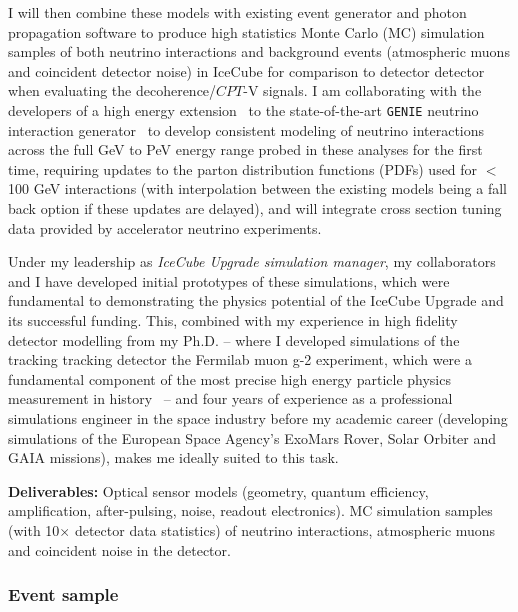 \documentclass[a4paper,11pt]{article}
\begin{document}
I will then combine these models with existing event generator and photon propagation software to produce high statistics Monte Carlo (MC) simulation samples of both neutrino interactions and background events (atmospheric muons and coincident detector noise) in IceCube for comparison to detector detector when evaluating the decoherence/$CPT$-V signals. I am collaborating with the developers of a high energy extension~\cite{Garcia:2019hze} to the state-of-the-art \texttt{GENIE} neutrino interaction generator~\cite{Andreopoulos:2009zz} to develop consistent modeling of neutrino interactions across the full GeV to PeV energy range probed in these analyses for the first time, requiring updates to the parton distribution functions (PDFs) used for $<$100 GeV interactions (with interpolation between the existing models being a fall back option if these updates are delayed), and will integrate cross section tuning data provided by accelerator neutrino experiments. 

Under my leadership as \textit{IceCube Upgrade simulation manager}, my collaborators and I have developed initial prototypes of these simulations, which were fundamental to demonstrating the physics potential of the IceCube Upgrade and its successful funding. This, combined with my experience in high fidelity detector modelling from my Ph.D. -- where I developed simulations of the tracking tracking detector the Fermilab muon g-2 experiment, which were a fundamental component of the most precise high energy particle physics measurement in history~\cite{gm2_run1_result} -- and four years of experience as a professional simulations engineer in the space industry before my academic career (developing simulations of the European Space Agency's ExoMars Rover, Solar Orbiter and GAIA missions), makes me ideally suited to this task. 

\textbf{Deliverables:} Optical sensor models (geometry, quantum efficiency, amplification, after-pulsing, noise, readout electronics). MC simulation samples (with 10$\times$ detector data statistics) of neutrino interactions, atmospheric muons and coincident noise in the detector. \\


\subsubsection{Event sample}
\end{document}
